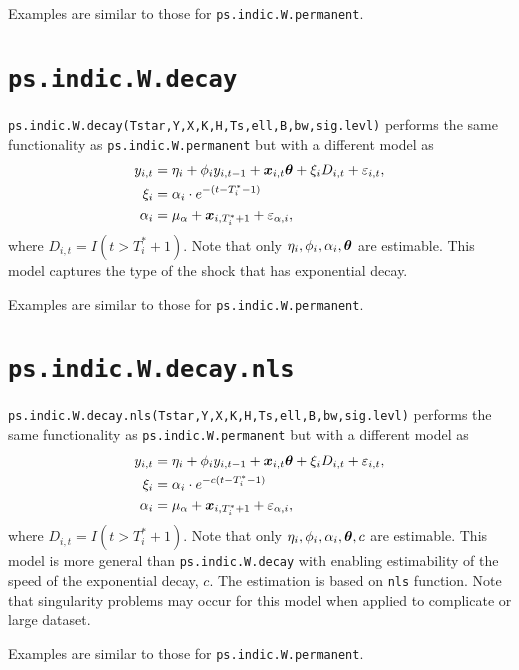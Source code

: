 \documentclass[12pt]{article}
\begin{document}
Examples are similar to those for \texttt{ps.indic.W.permanent}.

\section{\texttt{ps.indic.W.decay}}
 
 \texttt{ps.indic.W.decay(Tstar,Y,X,K,H,Ts,ell,B,bw,sig.levl)} performs the same functionality as  \texttt{ps.indic.W.permanent} but with a different model as 
 \begin{align*}
 	y_{i,t} &= \eta_i + \phi_i y_{i, t-1}  + \boldsymbol{x}_{i, t}\boldsymbol{\theta} + \xi_i D_{i,t} + \varepsilon_{i,t},\\
 	\xi_i &= \alpha_i \cdot e^{-(t-T_i^*-1)} \\
 	\alpha_i & = \mu_{\alpha} + \boldsymbol{x}_{i, T_i^*+1} + \varepsilon_{\alpha, i},
 \end{align*}
 where $D_{i,t}=I(t > T_i^*+1)$. Note that only $\eta_i, \phi_i, \alpha_i, \boldsymbol{\theta}$ are estimable. This model captures the type of the shock that has exponential decay.
 
 Examples are similar to those for \texttt{ps.indic.W.permanent}.
 
 \section{\texttt{ps.indic.W.decay.nls}}
 
 \texttt{ps.indic.W.decay.nls(Tstar,Y,X,K,H,Ts,ell,B,bw,sig.levl)} performs the same functionality as  \texttt{ps.indic.W.permanent} but with a different model as 
 \begin{align*}
 	y_{i,t} &= \eta_i + \phi_i y_{i, t-1}  + \boldsymbol{x}_{i, t}\boldsymbol{\theta} + \xi_i D_{i,t} + \varepsilon_{i,t},\\
 	\xi_i &= \alpha_i \cdot e^{-c(t-T_i^*-1)} \\
 	\alpha_i & = \mu_{\alpha} + \boldsymbol{x}_{i, T_i^*+1} + \varepsilon_{\alpha, i},
 \end{align*}
 where $D_{i,t}=I(t > T_i^*+1)$. Note that only $\eta_i, \phi_i, \alpha_i, \boldsymbol{\theta},c$ are estimable. This model  is more general than \texttt{ps.indic.W.decay} with enabling estimability of the speed of the exponential decay, $c$. The estimation is based on \texttt{nls} function. Note that singularity problems may occur for this model when applied to complicate or large dataset.
 
 Examples are similar to those for \texttt{ps.indic.W.permanent}.


\end{document}
